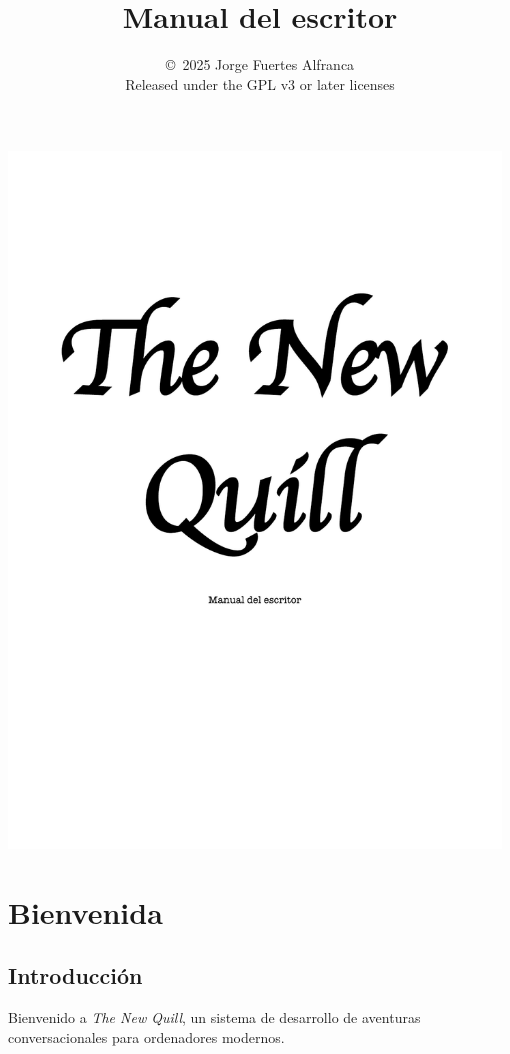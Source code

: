 \documentclass{report}
\title{\tnq\\ \large Manual del escritor}
\author{\copyright\ 2025 Jorge Fuertes Alfranca \\ \small Released under the GPL v3 or later licenses}
\newcommand{\tnq}{\textit{The New Quill}}
\begin{document}
\begin{center}
\includegraphics[width=0.98\textwidth]{gfx/portada.pdf}
\end{center}
\newpage

\maketitle
\tableofcontents
\newpage

\chapter{Bienvenida}
    \section{Introducción}
        Bienvenido a \tnq, un sistema de desarrollo de aventuras conversacionales para ordenadores modernos.
        
\end{document}
